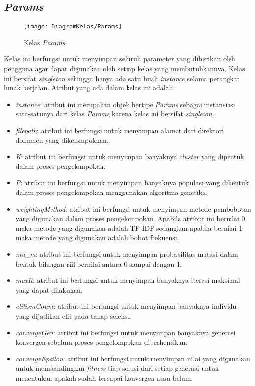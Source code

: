 \subsection{\textit{Params}}

\begin{figure}[H]
	\begin{center}
		\texttt{[image: DiagramKelas/Params]}
		\caption{Kelas \textit{Params}}
		\label{fig:kelasParams}
	\end{center}
\end{figure}

Kelas ini berfungsi untuk menyimpan seluruh parameter yang diberikan oleh pengguna agar dapat digunakan oleh setiap kelas yang membutuhkannya. Kelas ini bersifat \textit{singleton} sehingga hanya ada satu buah \textit{instance} selama perangkat lunak berjalan. Atribut yang ada dalam kelas ini adalah:

\begin{itemize}
	\item \textit{instance}: atribut ini merupakan objek bertipe \textit{Params} sebagai instansiasi satu-satunya dari kelas \textit{Params} karena kelas ini bersifat \textit{singleton}.
	\item \textit{filepath}: atribut ini berfungsi untuk menyimpan alamat dari direktori dokumen yang dikelompokkan.
	\item \textit{K}: atribut ini berfungsi untuk menyimpan banyaknya \textit{cluster} yang dipentuk dalam proses pengelompokan.
	\item \textit{P}: atribut ini berfungsi untuk menyimpan banyaknya populasi yang dibentuk dalam proses pengelompokan menggunakan algoritma genetika.
	\item \textit{weightingMethod}: atribut ini berfungsi untuk menyimpan metode pembobotan yang digunakan dalam proses pengelompokan. Apabila atribut ini bernilai 0 maka metode yang digunakan adalah TF-IDF sedangkan apabila bernilai 1 maka metode yang digunakan adalah bobot frekuensi.
	\item \textit{mu}\_\textit{m}: atribut ini berfungsi untuk menyimpan probabilitas mutasi dalam bentuk bilangan riil bernilai antara 0 sampai dengan 1.
	\item \textit{maxIt}: atribut ini berfungsi untuk menyimpan banyaknya iterasi maksimal yang dapat dilakukan.
	\item \textit{elitismCount}: atribut ini berfungsi untuk menyimpan banyaknya individu yang dijadikan elit pada tahap seleksi.
	\item \textit{convergeGen}: atribut ini berfungsi untuk menyimpan banyaknya generasi konvergen sebelum proses pengelompokan diberhentikan.
	\item \textit{convergeEpsilon}: atribut ini berfungsi untuk menyimpan nilai yang digunakan untuk membandingkan \textit{fitness} tiap solusi dari setiap generasi untuk menentukan apakah sudah tercapai konvergen atau belum.
\end{itemize}

